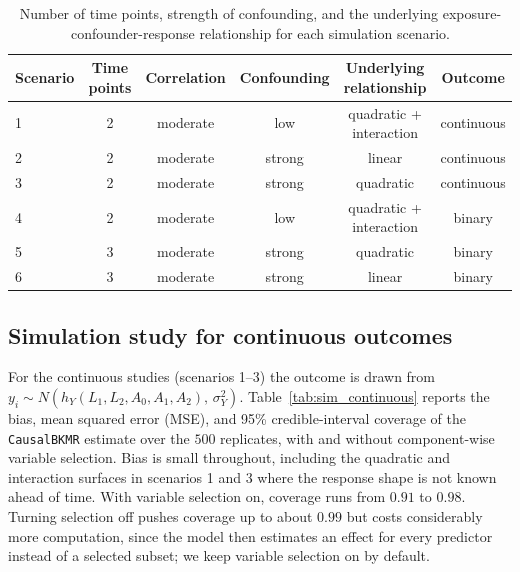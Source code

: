 \documentclass[11pt]{article}
\newcommand{\pkg}[1]{\texttt{#1}}
\begin{document}
\begin{table}[h]
\centering
\caption{Number of time points, strength of confounding, and the underlying exposure-confounder-response relationship for each simulation scenario.}
\label{tab:sim_scenarios}
\begin{tabular}{lccccc}
\toprule
Scenario & Time points & Correlation & Confounding & Underlying relationship & Outcome \\
\midrule
1 & 2 & moderate & low    & quadratic + interaction & continuous \\
2 & 2 & moderate & strong & linear                  & continuous \\
3 & 2 & moderate & strong & quadratic               & continuous \\
4 & 2 & moderate & low    & quadratic + interaction & binary     \\
5 & 3 & moderate & strong & quadratic               & binary     \\
6 & 3 & moderate & strong & linear                  & binary     \\
\bottomrule
\end{tabular}
\end{table}

\subsection*{Simulation study for continuous outcomes}

For the continuous studies (scenarios 1--3) the outcome is drawn from $y_i \sim N(h_Y(L_1, L_2, A_0, A_1, A_2),\, \sigma^2_Y)$. Table~\ref{tab:sim_continuous} reports the bias, mean squared error (MSE), and 95\% credible-interval coverage of the \pkg{CausalBKMR} estimate over the $500$ replicates, with and without component-wise variable selection. Bias is small throughout, including the quadratic and interaction surfaces in scenarios 1 and 3 where the response shape is not known ahead of time. With variable selection on, coverage runs from $0.91$ to $0.98$. Turning selection off pushes coverage up to about $0.99$ but costs considerably more computation, since the model then estimates an effect for every predictor instead of a selected subset; we keep variable selection on by default.
\end{document}
